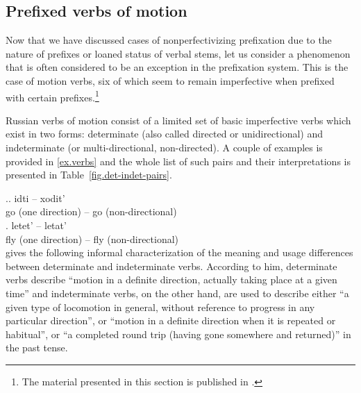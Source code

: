 \subsection{Prefixed verbs of motion}\label{subsection:perf:motion}

Now that we have discussed cases of nonperfectivizing prefixation due to the nature of prefixes or loaned status of verbal stems, let us consider a phenomenon that is often considered to be an exception in the prefixation system. This is the case of motion verbs, six of which seem to remain imperfective when prefixed with certain prefixes.\footnote{The material presented in this section is published in \cite{ZinovaOsswald:paper}.}

Russian verbs of motion consist of a limited set of basic imperfective verbs which exist in two forms: determinate (also called directed or unidirectional) and indeterminate (or multi-directional, non-directed). A couple of examples is provided in \ref{ex.verbs} and the whole list of such pairs and their interpretations is presented in Table~\ref{fig.det-indet-pairs}.

\ex.\label{ex.verbs}\ag. idti -- xodit'\\
{go (one direction)} -- {go (non-directional)}\\
\bg. letet' -- letat'\\
{fly (one direction)} -- {fly (non-directional)}\\

\citet[pp.~3f]{Stilman:51} gives the following informal characterization of the meaning and usage differences between determinate and indeterminate verbs. According to him, determinate verbs describe ``motion in a definite direction, actually taking place at a given time'' and indeterminate verbs, on the other hand, are used to describe either ``a given type of locomotion in general, without reference to progress in any particular direction'', or ``motion in a definite direction when it is repeated or habitual'', or ``a completed round trip (having gone somewhere and returned)'' in the past tense.

